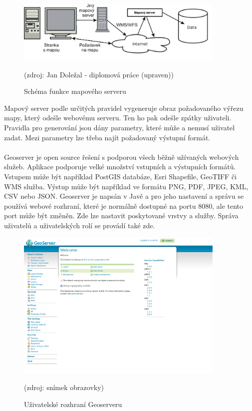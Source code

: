 \documentclass[11pt,a4paper,titlepage,oneside]{book}
\begin{document}
		\begin{figure}[!h]
			\begin{center}
				\includegraphics[width=10cm]{obrazky/mapserver.png}
				\caption{Schéma funkce mapového serveru}
				\label{fig:server_schema}
				(zdroj: Jan Doležal - diplomová práce\cite{dp_dolezal} (upraven))
			\end{center}
		\end{figure}
Mapový server podle určitých pravidel vygeneruje obraz požadovaného výřezu mapy, který odešle webovému serveru. Ten ho pak odešle zpátky uživateli. Pravidla pro generování jsou dány parametry, které může a nemusí uživatel zadat. Mezi parametry lze třeba najít požadovaný výstupní formát.




		\paragraph{} Geoserver je open source řešení s  podporou všech běžně užívaných webových služeb. Aplikace podporuje velké množství vstupních a výstupních formátů. Vstupem může být například PostGIS databáze, Esri Shapefile, GeoTIFF či \ac{WMS} služba. Výstup může být například ve formátu PNG, PDF, JPEG, KML, CSV nebo JSON.  Geoserver je napsán v Javě a pro jeho nastavení a správu se používá webové rozhraní, které je normálně dostupné na portu 8080, ale tento port může být změněn. Zde lze nastavit poskytované vrstvy a služby. Správa uživatelů a uživatelských rolí se provádí také zde. 
		\begin{figure}[!h]
			\begin{center}
				\includegraphics[width=10cm]{obrazky/geoserver.png}
				\caption{Uživatelské rozhraní Geoserveru}
				(zdroj: snímek obrazovky)
			\end{center}
		\end{figure}
\end{document}
